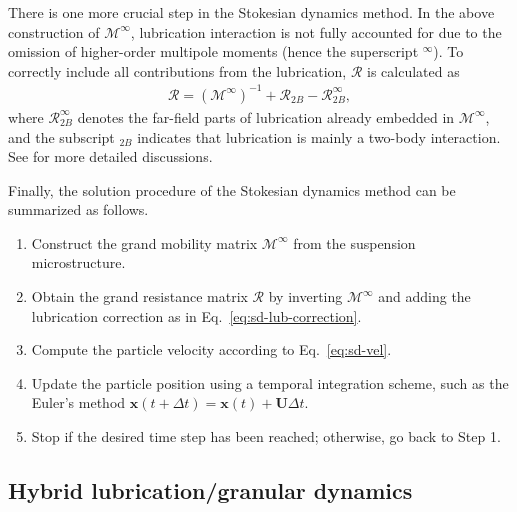 There is one more crucial step in the Stokesian dynamics method.
In the above construction of $\mathscr{M}^\infty$, lubrication interaction is not fully accounted for due to the omission of higher-order multipole moments (hence the superscript $^\infty$). To correctly include all contributions from the lubrication, $\mathscr{R}$ is calculated as
\begin{equation} \label{eq:sd-lub-correction}
 \begin{aligned}
  \mathscr{R} = (\mathscr{M}^\infty)^{-1} +\mathscr{R}_{2B} - \mathscr{R}_{2B}^\infty,
 \end{aligned}
\end{equation}
where $\mathscr{R}_{2B}^\infty$ denotes the far-field parts of lubrication already embedded in $\mathscr{M}^\infty$, and the subscript $_{2B}$ indicates that lubrication is mainly a two-body interaction. See \cite{durlofsky_brady_bossis_1987, Brady_Bossis1988} for more detailed discussions.  

Finally, the solution procedure of the Stokesian dynamics method can be summarized as follows.
\begin{enumerate}
\item Construct the grand mobility matrix $\mathscr{M}^\infty$ from the suspension microstructure.
\item Obtain the grand resistance matrix $\mathscr{R}$ by inverting $\mathscr{M}^\infty$ and adding the lubrication correction as in Eq.\ \eqref{eq:sd-lub-correction}.
\item Compute the particle velocity according to Eq.\ \eqref{eq:sd-vel}.
\item Update the particle position using a temporal integration scheme, such as the Euler's method $\bm{x}(t+\Delta t)= \bm{x}(t) +\bm{U} \Delta t$.
\item Stop if the desired time step has been reached; otherwise, go back to Step 1.
\end{enumerate}


\subsection{Hybrid lubrication/granular dynamics}


